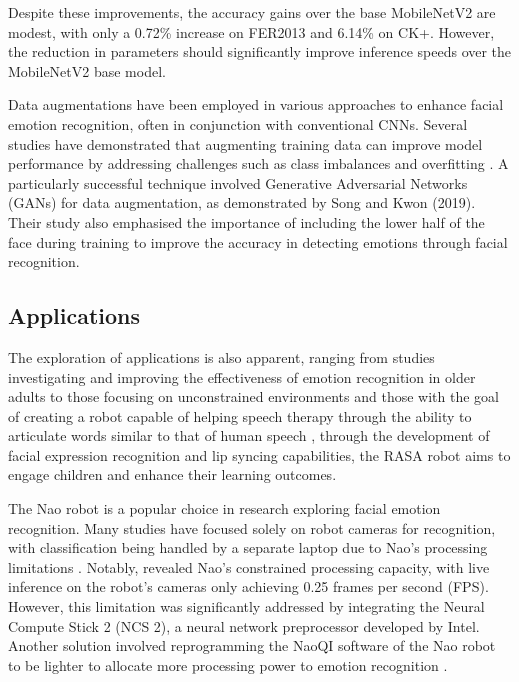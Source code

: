 Despite these improvements, the accuracy gains over the base MobileNetV2 are modest, with only a 0.72\% increase on FER2013 and 6.14\% on CK+. However, the reduction in parameters should significantly improve inference speeds over the MobileNetV2 base model.

Data augmentations have been employed in various approaches to enhance facial emotion recognition, often in conjunction with conventional CNNs. Several studies have demonstrated that augmenting training data can improve model performance by addressing challenges such as class imbalances and overfitting \cite{Saxena2022-sr} \cite{Ruiz-Garcia2018-uy}. A particularly successful technique involved Generative Adversarial Networks (GANs) for data augmentation, as demonstrated by Song and Kwon (2019). Their study also emphasised the importance of including the lower half of the face during training to improve the accuracy in detecting emotions through facial recognition.

\subsection{Applications}

The exploration of applications is also apparent, ranging from studies investigating and improving the effectiveness of emotion recognition in older adults \cite{Ma2019-ng} to those focusing on unconstrained environments \cite{Webb2020-bq} and those with the goal of creating a robot capable of helping speech therapy through the ability to articulate words similar to that of human speech \cite{Esfandbod2023-eq}, through the development of facial expression recognition and lip syncing capabilities, the RASA robot aims to engage children and enhance their learning outcomes.

The Nao robot is a popular choice in research exploring facial emotion recognition. Many studies have focused solely on robot cameras for recognition, with classification being handled by a separate laptop due to Nao's processing limitations \cite{Ruiz-Garcia2018-zq}. Notably, \cite{Melinte2020-ky} revealed Nao's constrained processing capacity, with live inference on the robot's cameras only achieving 0.25 frames per second (FPS). However, this limitation was significantly addressed by integrating the Neural Compute Stick 2 (NCS 2), a neural network preprocessor developed by Intel. Another solution involved reprogramming the NaoQI software of the Nao robot to be lighter to allocate more processing power to emotion recognition \cite{Lopez-Rincon2019-et}.

